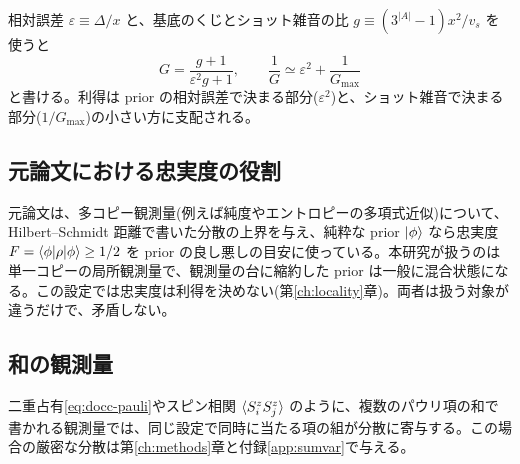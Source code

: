 相対誤差 $\varepsilon\equiv\Delta/x$ と、基底のくじとショット雑音の比 $g\equiv(3^{\lvert A\rvert}-1)x^2/v_s$ を使うと
\begin{equation}
  G=\frac{g+1}{\varepsilon^2g+1},\qquad\frac1G\simeq\varepsilon^2+\frac1{G_{\max}}
  \label{eq:two-regime}
\end{equation}
と書ける。利得は prior の相対誤差で決まる部分($\varepsilon^2$)と、ショット雑音で決まる部分($1/G_{\max}$)の小さい方に支配される。

\subsection{元論文における忠実度の役割}
元論文は、多コピー観測量(例えば純度やエントロピーの多項式近似)について、Hilbert--Schmidt 距離で書いた分散の上界を与え、純粋な prior $|\phi\rangle$ なら忠実度 $F=\langle \phi|\rho|\phi\rangle\ge1/2$ を prior の良し悪しの目安に使っている。本研究が扱うのは単一コピーの局所観測量で、観測量の台に縮約した prior は一般に混合状態になる。この設定では忠実度は利得を決めない(第\ref{ch:locality}章)。両者は扱う対象が違うだけで、矛盾しない。

\subsection{和の観測量}
二重占有\eqref{eq:docc-pauli}やスピン相関 $\langle S^z_iS^z_j\rangle$ のように、複数のパウリ項の和で書かれる観測量では、同じ設定で同時に当たる項の組が分散に寄与する。この場合の厳密な分散は第\ref{ch:methods}章と付録\ref{app:sumvar}で与える。
